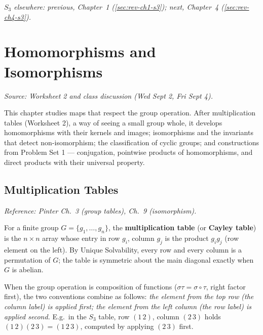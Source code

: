 \documentclass[11pt]{report}
\begin{document}
\textit{$S_3$ elsewhere: previous, Chapter~1 (\ref{sec:rev-ch1-s3}); next, Chapter~4 (\ref{sec:rev-ch4-s3}).}

\chapter{Homomorphisms and Isomorphisms}\label{ch:homs}


\textit{Source: Worksheet 2 and class discussion (Wed Sept 2, Fri Sept 4).}

This chapter studies maps that respect the group operation. After multiplication tables (Worksheet 2), a way of seeing a small group whole, it develops homomorphisms with their kernels and images; isomorphisms and the invariants that detect non-isomorphism; the classification of cyclic groups; and constructions from Problem Set 1 --- conjugation, pointwise products of homomorphisms, and direct products with their universal property.

\section{Multiplication Tables}\label{sec:tables}

\textit{Reference: Pinter Ch.\ 3 (group tables), Ch.\ 9 (isomorphism).}

\begin{defbox}\label{def:multiplication-table}
For a finite group $G = \{g_1, \ldots, g_n\}$, the \textbf{multiplication table} (or \textbf{Cayley table}) is the $n \times n$ array whose entry in row $g_i$, column $g_j$ is the product $g_i g_j$ (row element on the left). By Unique Solvability, every row and every column is a permutation of $G$; the table is symmetric about the main diagonal exactly when $G$ is abelian.

When the group operation is composition of functions ($\sigma\tau = \sigma \circ \tau$, right factor first), the two conventions combine as follows: \emph{the element from the top row (the column label) is applied first; the element from the left column (the row label) is applied second.} E.g.\ in the $S_3$ table, row $(1\,2)$, column $(2\,3)$ holds $(1\,2)(2\,3) = (1\,2\,3)$, computed by applying $(2\,3)$ first.
\end{defbox}
\end{document}
